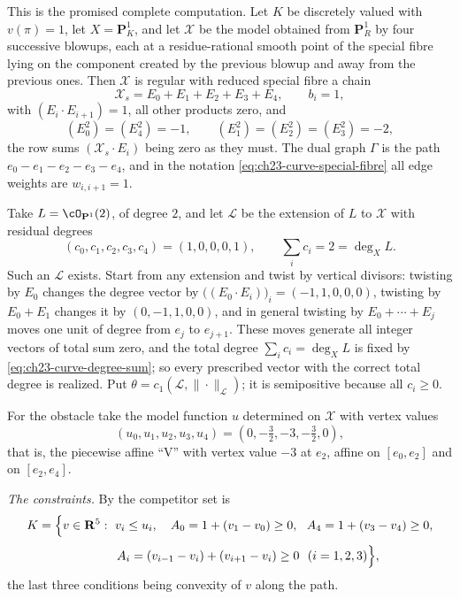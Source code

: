\begin{example}
\label{ex:ch23-curve-envelope-numbers}
This is the promised complete computation.  Let $K$ be discretely valued
with $v(\pi)=1$, let $X=\mathbf P^1_K$, and let $\mathcal X$ be the
model obtained from $\mathbf P^1_R$ by four successive blowups, each at a
residue-rational smooth point of the special fibre lying on the component created by the
previous blowup and away from the previous ones.  Then $\mathcal X$ is
regular with reduced special fibre a chain
\[
 \mathcal X_s=E_0+E_1+E_2+E_3+E_4,
 \qquad b_i=1,
\]
with $(E_i\cdot E_{i+1})=1$, all other products zero, and
\[
 (E_0^2)=(E_4^2)=-1,\qquad (E_1^2)=(E_2^2)=(E_3^2)=-2 ,
\]
the row sums $(\mathcal X_s\cdot E_i)$ being zero as they must.  The dual
graph $\Gamma$ is the path $e_0-e_1-e_2-e_3-e_4$, and in the notation
\eqref{eq:ch23-curve-special-fibre} all edge weights are
$w_{i,i+1}=1$.

Take $L=\cO_{\mathbf P^1}(2)$, of degree $2$, and let $\mathcal L$ be
the extension of $L$ to $\mathcal X$ with residual degrees
\[
 (c_0,c_1,c_2,c_3,c_4)=(1,0,0,0,1),
 \qquad \sum_ic_i=2=\deg_XL .
\]
Such an $\mathcal L$ exists.  Start from any extension and twist by
vertical divisors: twisting by $E_0$ changes the degree vector by
$\bigl((E_0\cdot E_i)\bigr)_i=(-1,1,0,0,0)$, twisting by $E_0+E_1$
changes it by $(0,-1,1,0,0)$, and in general twisting by
$E_0+\cdots+E_j$ moves one unit of degree from $e_j$ to $e_{j+1}$.
These moves generate all integer vectors of total sum zero, and the total
degree $\sum_ic_i=\deg_XL$ is fixed by
\eqref{eq:ch23-curve-degree-sum}; so every prescribed vector with the
correct total degree is realized.  Put
$\theta=c_1(\mathcal L,\|\cdot\|_{\mathcal L})$; it is semipositive
because all $c_i\geq0$.

For the obstacle take the model function $u$ determined on $\mathcal X$
with vertex values
\[
 (u_0,u_1,u_2,u_3,u_4)=(0,-\tfrac32,-3,-\tfrac32,0),
\]
that is, the piecewise affine ``V'' with vertex value $-3$ at $e_2$,
affine on $[e_0,e_2]$ and on $[e_2,e_4]$.

\emph{The constraints.}  By
 the competitor set is
\[
 K=\Bigl\{v\in\mathbf R^5:\ v_i\leq u_i,\quad
   A_0=1+(v_1-v_0)\geq0,\ \
   A_4=1+(v_3-v_4)\geq0,
\]
\[
 \phantom{K=\Bigl\{}
   A_i=(v_{i-1}-v_i)+(v_{i+1}-v_i)\geq0\ \ (i=1,2,3)\Bigr\},
\]
the last three conditions being convexity of $v$ along the path.


\end{example}
